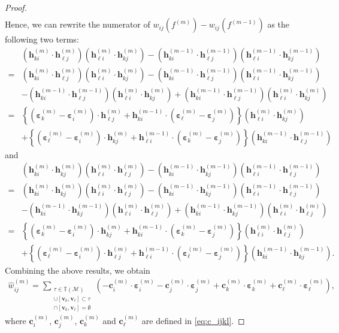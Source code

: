 \documentclass[onefignum,onetabnum]{siamonline220329}
\numberwithin{equation}{section}
\def\c{\mathbf{c}}
\def\h{\mathbf{h}}
\def\bv{\mathbf{v}}
\def\beps{{\boldsymbol{\varepsilon}}}
\begin{document}
\begin{sloppypar}
\begin{proof}
\begin{align*}
\end{align*}
Hence, we can rewrite the numerator of $w_{ij}(f^{(m)})-w_{ij}(f^{(m-1)})$ as the following two terms:
\begin{align*}
& (\h_{k i}^{(m)} \cdot \h_{\ell j}^{(m)} ) ( \h_{\ell i}^{(m)} \cdot \h_{k j}^{(m)} ) - (\h_{k i}^{(m-1)} \cdot \h_{\ell j}^{(m-1)} ) ( \h_{\ell i}^{(m-1)} \cdot \h_{k j}^{(m-1)} ) \nonumber \\
%
=&(\h_{k i}^{(m)} \cdot \h_{\ell j}^{(m)} ) ( \h_{\ell i}^{(m)} \cdot \h_{k j}^{(m)} ) - (\h_{k i}^{(m-1)} \cdot \h_{\ell j}^{(m-1)} ) ( \h_{\ell i}^{(m-1)} \cdot \h_{k j}^{(m-1)} ) \\
&-(\h_{k i}^{(m-1)} \cdot \h_{\ell j}^{(m-1)} ) (\h_{\ell i}^{(m)} \cdot \h_{k j}^{(m)} ) + (\h_{k i}^{(m-1)} \cdot \h_{\ell j}^{(m-1)} ) (\h_{\ell i}^{(m)} \cdot \h_{k j}^{(m)} )\\
=&\left\{(\beps^{(m)}_k-\beps^{(m)}_i) \cdot \h_{\ell j}^{(m)} + \h_{k i}^{(m-1)} \cdot (\beps^{(m)}_\ell-\beps^{(m)}_j)\right\}(\h_{\ell i}^{(m)} \cdot \h_{k j}^{(m)})\\
&+\left\{(\beps^{(m)}_\ell-\beps^{(m)}_i) \cdot \h_{k j}^{(m)}+\h_{\ell i}^{(m-1)}\cdot(\beps^{(m)}_k-\beps^{(m)}_j)\right\}(\h_{k i}^{(m-1)} \cdot \h_{\ell j}^{(m-1)}) 
\end{align*}
and
\begin{align*}
& (\h_{k i}^{(m)} \cdot \h_{k j}^{(m)} ) ( \h_{\ell i}^{(m)} \cdot \h_{\ell j}^{(m)} ) - (\h_{k i}^{(m-1)} \cdot \h_{k j}^{(m-1)} ) ( \h_{\ell i}^{(m-1)} \cdot \h_{\ell j}^{(m-1)} ) \nonumber \\ 
%
=&(\h_{k i}^{(m)} \cdot \h_{k j}^{(m)} ) ( \h_{\ell i}^{(m)} \cdot \h_{\ell j}^{(m)} ) - (\h_{k i}^{(m-1)} \cdot \h_{k j}^{(m-1)} ) ( \h_{\ell i}^{(m-1)} \cdot \h_{\ell j}^{(m-1)} ) \\
&- (\h_{k i}^{(m-1)} \cdot \h_{k j}^{(m-1)} ) ( \h_{\ell i}^{(m)} \cdot \h_{\ell j}^{(m)} ) + (\h_{k i}^{(m-1)} \cdot \h_{k j}^{(m-1)} ) ( \h_{\ell i}^{(m)} \cdot \h_{\ell j}^{(m)} ) \\ 
=&\left\{(\beps^{(m)}_k-\beps^{(m)}_i) \cdot \h_{k j}^{(m)} + \h_{k i}^{(m-1)} \cdot (\beps^{(m)}_k-\beps^{(m)}_j)\right\}( \h_{\ell i}^{(m)} \cdot \h_{\ell j}^{(m)} )\\
&+\left\{(\beps^{(m)}_\ell-\beps^{(m)}_i) \cdot \h_{\ell j}^{(m)} +\h_{\ell i}^{(m-1)} \cdot (\beps^{(m)}_\ell-\beps^{(m)}_j)\right\}( \h_{k i}^{(m-1)} \cdot \h_{k j}^{(m-1)} ). 
\end{align*}
Combining the above results, we obtain
\begin{align*}
\widehat{w}_{ij}^{(m)} = \sum_{\substack{\tau\in\mathbb{T}(\mathcal{M})\\ [\bv_i,\bv_j]\cup[\bv_k, \bv_{\ell}]\subset\tau\\ [\bv_i,\bv_j]\cap[\bv_k, \bv_{\ell}]=\emptyset}}\left(-\c_i^{(m)} \cdot \beps_i^{(m)}-\c_j^{(m)} \cdot \beps_j^{(m)}+\c_k^{(m)} \cdot \beps_k^{(m)}+\c_{\ell}^{(m)} \cdot \beps_{\ell}^{(m)}\right),
\end{align*}
where $\c_i^{(m)}$, $\c_j^{(m)}$, $\c_k^{(m)}$ and $\c_{\ell}^{(m)}$ are defined in \eqref{eq:c_ijkl}.
\end{proof}


\end{sloppypar}
\end{document}
